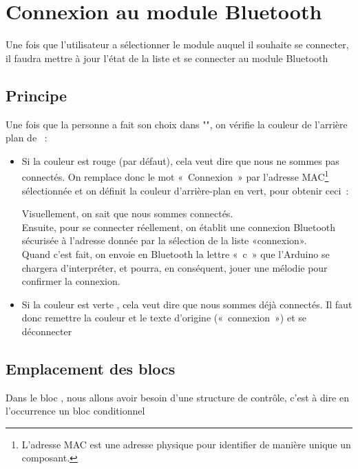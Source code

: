 \section{Connexion au module Bluetooth}

Une fois que l'utilisateur a sélectionner le module auquel il souhaite se connecter, il faudra mettre à jour l'état de la liste et se connecter au module Bluetooth

\subsection{Principe}
Une fois que la personne a fait son choix dans "", on vérifie la couleur de l'arrière plan de  :

\begin{itemize}
    \item Si la couleur est rouge (par défaut), cela veut dire que nous ne sommes pas connectés.
    On remplace donc le mot « Connexion » par l'adresse MAC\footnote{L'adresse MAC est une adresse physique pour identifier de manière unique un composant.} sélectionnée et on définit la couleur d'arrière-plan en vert, pour obtenir ceci :
    
    
    
Visuellement, on sait que nous sommes connectés. \\
Ensuite,  pour se connecter réellement, on établit une connexion Bluetooth sécurisée à l'adresse donnée par la sélection de la liste «connexion». \\
Quand c'est fait, on envoie en Bluetooth la lettre « c » que l'Arduino se chargera d'interpréter, et pourra, en conséquent, jouer une mélodie pour confirmer la connexion.
    
   
    \item Si la couleur est verte , cela veut dire que nous sommes déjà connectés. Il faut donc remettre la couleur et le texte d'origine (« connexion ») et se déconnecter
    
\end{itemize}

\subsection{Emplacement des blocs}


Dans le bloc , nous allons avoir besoin d'une structure de contrôle, c'est à dire en l'occurrence un bloc conditionnel 


